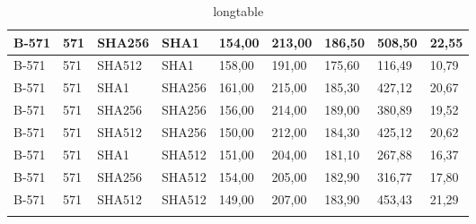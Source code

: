 \begin{longtable}{| l | l | l | l | l |l |l |l |l |}
B-571 & 571 & SHA256 & SHA1 & 154,00 & 213,00 & 186,50 & 508,50 & 22,55 \\ \hline 
B-571 & 571 & SHA512 & SHA1 & 158,00 & 191,00 & 175,60 & 116,49 & 10,79 \\ \hline 
B-571 & 571 & SHA1 & SHA256 & 161,00 & 215,00 & 185,30 & 427,12 & 20,67 \\ \hline 
B-571 & 571 & SHA256 & SHA256 & 156,00 & 214,00 & 189,00 & 380,89 & 19,52 \\ \hline 
B-571 & 571 & SHA512 & SHA256 & 150,00 & 212,00 & 184,30 & 425,12 & 20,62 \\ \hline 
B-571 & 571 & SHA1 & SHA512 & 151,00 & 204,00 & 181,10 & 267,88 & 16,37 \\ \hline 
B-571 & 571 & SHA256 & SHA512 & 154,00 & 205,00 & 182,90 & 316,77 & 17,80 \\ \hline 
B-571 & 571 & SHA512 & SHA512 & 149,00 & 207,00 & 183,90 & 453,43 & 21,29 \\ \hline 
\caption{longtable}
\end{longtable}